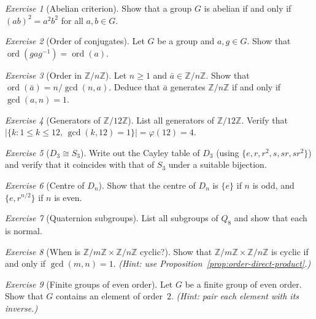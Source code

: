 \documentclass[12pt,a4paper,openany]{book}
\theoremstyle{definition}
\theoremstyle{remark}
\newtheorem{exercise}{Exercise}[chapter]
\newcommand{\Z}{\mathbb{Z}}
\DeclareMathOperator{\ord}{ord}
\renewcommand{\gcd}{\operatorname{gcd}}
\begin{document}
\begin{exercise}[Abelian criterion]
\label{exer:ch1-2}
Show that a group $G$ is abelian if and only if $(ab)^2=a^2b^2$ for all
$a,b\in G$.
\end{exercise}

\begin{exercise}[Order of conjugates]
\label{exer:ch1-3}
Let $G$ be a group and $a,g\in G$.  Show that $\ord(gag^{-1})=\ord(a)$.
\end{exercise}

\begin{exercise}[Order in $\Z/n\Z$]
\label{exer:ch1-4}
Let $n\ge 1$ and $\bar a\in\Z/n\Z$.  Show that
$\ord(\bar a) = n/\gcd(n,a)$.  Deduce that $\bar a$ generates $\Z/n\Z$ if
and only if $\gcd(a,n)=1$.
\end{exercise}

\begin{exercise}[Generators of $\Z/12\Z$]
\label{exer:ch1-5}
List all generators of $\Z/12\Z$.  Verify that $|\{k : 1\le k\le 12,\,
\gcd(k,12)=1\}| = \varphi(12) = 4$.
\end{exercise}

\begin{exercise}[$D_3\cong S_3$]
\label{exer:ch1-6}
Write out the Cayley table of $D_3$ (using $\{e,r,r^2,s,sr,sr^2\}$) and
verify that it coincides with that of $S_3$ under a suitable bijection.
\end{exercise}

\begin{exercise}[Centre of $D_n$]
\label{exer:ch1-7}
Show that the centre of $D_n$ is $\{e\}$ if $n$ is odd, and
$\{e,r^{n/2}\}$ if $n$ is even.
\end{exercise}

\begin{exercise}[Quaternion subgroups]
\label{exer:ch1-8}
List all subgroups of $Q_8$ and show that each is normal.
\end{exercise}

\begin{exercise}[When is $\Z/m\Z\times\Z/n\Z$ cyclic?]
\label{exer:ch1-9}
Show that $\Z/m\Z\times\Z/n\Z$ is cyclic if and only if $\gcd(m,n)=1$.
\textit{(Hint: use Proposition~\ref{prop:order-direct-product}.)}
\end{exercise}

\begin{exercise}[Finite groups of even order]
\label{exer:ch1-10}
Let $G$ be a finite group of even order.  Show that $G$ contains an element
of order~$2$.  \textit{(Hint: pair each element with its inverse.)}
\end{exercise}
\end{document}
